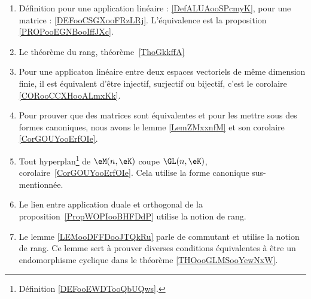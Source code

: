 	\label{THEMEooDimensionRang}
\begin{enumerate}
	\item Définition pour une application linéaire : \ref{DefALUAooSPcmyK}, pour une matrice : \ref{DEFooCSGXooFRzLRj}. L'équivalence est la proposition \ref{PROPooEGNBooIffJXc}.
	\item Le théorème du rang, théorème~\ref{ThoGkkffA}
	\item Pour une applicaton linéaire entre deux espaces vectoriels de même dimension finie, il est équivalent d'être injectif, surjectif ou bijectif, c'est le corolaire \ref{CORooCCXHooALmxKk}.
	\item Pour prouver que des matrices sont équivalentes et pour les mettre sous des formes canoniques, nous avons le lemme \ref{LemZMxxnfM} et son corolaire \ref{CorGOUYooErfOIe}.
	\item Tout hyperplan\footnote{Définition \ref{DEFooEWDTooQbUQws}.} de \( \eM(n,\eK)\) coupe \( \GL(n,\eK)\), corolaire~\ref{CorGOUYooErfOIe}. Cela utilise la forme canonique sus-mentionnée.
	\item Le lien entre application duale et orthogonal de la proposition~\ref{PropWOPIooBHFDdP} utilise la notion de rang.
	\item Le lemme \ref{LEMooDFFDooJTQkRu} parle de commutant et utilise la notion de rang. Ce lemme sert à prouver diverses conditions équivalentes à être un endomorphisme cyclique dans le théorème \ref{THOooGLMSooYewNxW}.
\end{enumerate}
